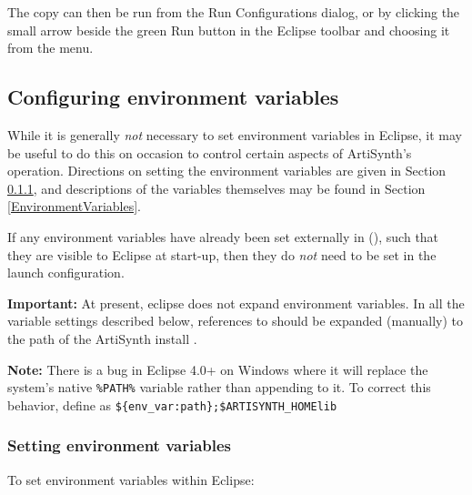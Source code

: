 The copy can then be run from the {\sf Run Configurations} dialog, or
by clicking the small arrow beside the green {\sf Run} button in the
Eclipse toolbar and choosing it from the menu.

\subsection{Configuring environment variables}
\label{EclipseEnvironmentVariables}

While it is generally {\it not} necessary to set environment variables
in Eclipse, it may be useful to do this on occasion to control certain
aspects of ArtiSynth's operation.  Directions on setting the
environment variables are given in
Section \ref{SettingEnvironmentVariables}, and descriptions of the
variables themselves may be found in
Section \ref{EnvironmentVariables}.

If any environment variables have already been set externally in
\SYSTEM{} (\environmentSectionRef), such that they are visible
to Eclipse at start-up, then they do {\it not} need to be set in the
launch configuration.

\ifNeedLibraryPath

\begin{sideblock}
{\bf Important:} At present, eclipse does not expand environment variables.
In all the variable settings described below, references to 
\ArtHome[]should be expanded (manually) to the path of the
ArtiSynth install \directory{}.
\end{sideblock}

\ifWindows
\begin{sideblock}
{\bf Note:} There is a bug in Eclipse 4.0+ on Windows where it will replace 
the system's native {\tt \%PATH\%} variable rather than appending to it.  
To correct this behavior, define \PATH{} as 
{\tt \$\{env\_var:path\};\$ARTISYNTH\_HOME\SEP lib\SEP \ARCH{}} 
\end{sideblock}
\fi %
\fi

\subsubsection {Setting environment variables}
\label{SettingEnvironmentVariables}

To set environment variables within Eclipse:

